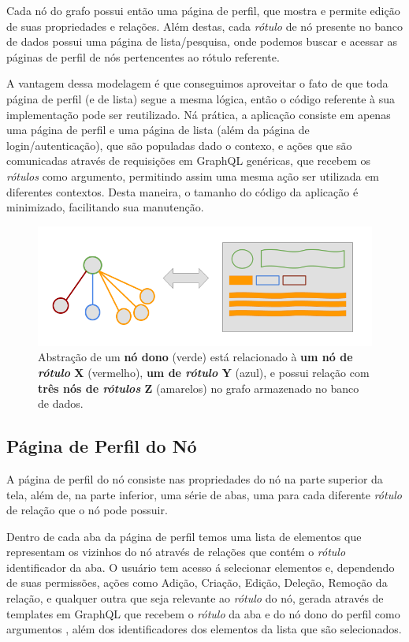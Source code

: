 \documentclass[12pt]{article}
\begin{document}
Cada nó do grafo possui então uma página de perfil, que mostra e permite edição de suas propriedades e relações. Além destas, cada \textit{rótulo} \cite{Neo4jLabels} de nó presente no banco de dados possui uma página de lista/pesquisa, onde podemos buscar e acessar as páginas de perfil de nós pertencentes ao rótulo referente.

A vantagem dessa modelagem é que conseguimos aproveitar o fato de que toda página de perfil (e de lista) segue a mesma lógica, então o código referente à sua implementação pode ser reutilizado. Ná prática, a aplicação consiste em apenas uma página de perfil e uma página de lista (além da página de login/autenticação), que são populadas dado o contexo, e ações que são comunicadas através de requisições em GraphQL genéricas, que recebem os \textit{rótulos} como argumento, permitindo assim uma mesma ação ser utilizada em diferentes contextos. Desta maneira, o tamanho do código da aplicação é minimizado, facilitando sua manutenção.

\begin{figure}[ht]
\centering
\includegraphics[width=1\textwidth]{isom.png}
\caption{Abstração de um \textbf{nó dono} (verde) está relacionado à \textbf{um nó de \textit{rótulo} X} (vermelho), \textbf{um de \textit{rótulo} Y} (azul), e possui relação com \textbf{três nós de \textit{rótulos} Z} (amarelos) no grafo armazenado no banco de dados.}
\label{fig:isom}
\end{figure}

\subsection{Página de Perfil do Nó}

A página de perfil do nó consiste nas propriedades do nó na parte superior da tela, além de, na parte inferior, uma série de abas, uma para cada diferente \textit{rótulo} de relação que o nó pode possuir.

Dentro de cada aba da página de perfil temos uma lista de elementos que representam os vizinhos do nó através de relações que contém o \textit{rótulo} identificador da aba. O usuário tem acesso á selecionar elementos e, dependendo de suas permissões, ações como Adição, Criação, Edição, Deleção, Remoção da relação, e qualquer outra que seja relevante ao \textit{rótulo} do nó, gerada através de templates em GraphQL que recebem o \textit{rótulo} da aba e do nó dono do perfil como argumentos \cite{GraphQL}, além dos identificadores dos elementos da lista que são selecionados.
\end{document}

